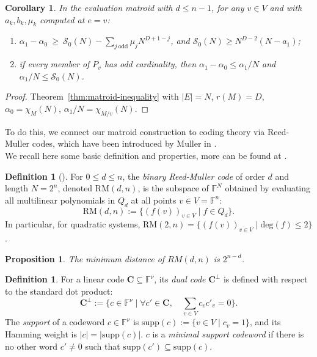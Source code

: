 \documentclass[11pt,a4paper]{article}
\newtheorem{proposition}[theorem]{Proposition}
\newtheorem{corollary}[theorem]{Corollary}
\theoremstyle{definition}
\newtheorem{definition}[theorem]{Definition}
\newcommand{\FF}{\mathbb{F}}
\begin{document}
\begin{corollary}\label{cor:alpha-inequality}
In the evaluation matroid with $d\le n-1$, for any $v\in V$ and with $a_k,b_k,\mu_k$ computed at $e=v$:
\begin{enumerate}[label=\textnormal{(\alph*)}]
\item $\alpha_1-\alpha_0\ \ge\ \mathcal S_0(N)-\sum_{j\ \mathrm{odd}}\mu_jN^{D+1-j}$, and $\mathcal S_0(N)\ge N^{D-2}(N-a_1)$;
\item if every member of $P_v$ has odd cardinality, then $\alpha_1-\alpha_0\le\alpha_1/N$ and $\alpha_1/N\le\mathcal S_0(N)$.
\end{enumerate}
\end{corollary}

\begin{proof}
Theorem~\ref{thm:matroid-inequality} with $|E|=N$, $r(M)=D$, $\alpha_0=\chi_M(N)$, $\alpha_1/N=\chi_{M/v}(N)$.
\end{proof}

To do this, we connect our matroid construction to coding theory via Reed-Muller codes, which have been introduced by Muller in \cite{RM}. \\
We recall here some basic definition and properties, more can be found at \cite{code}. 

\begin{definition}[\cite{reed,RM}]
For $0 \le d \le n$, the \emph{binary Reed-Muller code} of order $d$ and length $N = 2^n$, denoted $\mathrm{RM}(d,n)$, is the subspace of $\FF^N$ obtained by evaluating all multilinear polynomials in $Q_d$ at all points $v \in V = \mathbb{F}^n$:
\[
\mathrm{RM}(d,n) := \{ (f(v))_{v \in V}  \mid f \in Q_d \}.
\]
In particular, for quadratic systems, $\mathrm{RM}(2,n) = \{ (f(v))_{v \in V} \mid \mathrm{deg}(f) \le 2 \}$.
\end{definition}

\begin{proposition} \label{prop:rm-facts}
    The minimum distance of $RM(d,n)$ is $2^{n - d}$.
\end{proposition}

\begin{definition}
For a linear code $\mathbf{C} \subseteq \mathbb{F}^\nu$, its \emph{dual code} $\mathbf{C}^\perp$ is defined with respect to the standard dot product:
\[
\mathbf{C}^\perp := \{ c \in \mathbb{F}^\nu \mid \forall c' \in \mathbf{C}, \quad \sum_{v \in V} c_v c'_v = 0 \}.
\]
The \emph{support} of a codeword $c \in \mathbb{F}^\nu$ is $\mathrm{supp}(c) := \{ v \in V \mid c_v = 1 \}$, and its Hamming weight is $|c| = |\mathrm{supp}(c)|$.
$c$ is a \emph{minimal support codeword} \cite{ashikhminbarg,minimal} if there is no other word $c' \neq 0$ such that $\mathrm{supp}(c') \subseteq \mathrm{supp}(c)$.
\end{definition}
\end{document}
